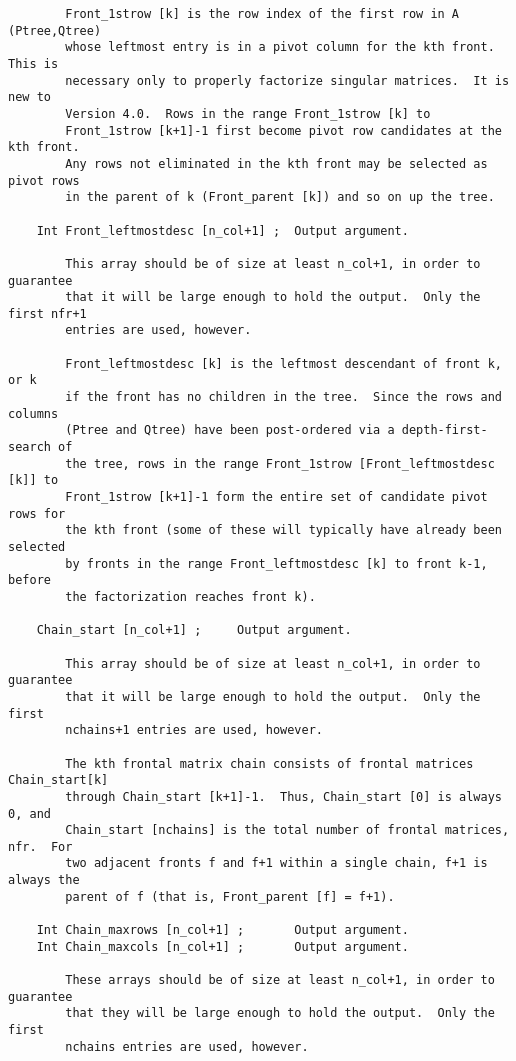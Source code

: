 {\begin{verbatim}
        Front_1strow [k] is the row index of the first row in A (Ptree,Qtree)
        whose leftmost entry is in a pivot column for the kth front.  This is
        necessary only to properly factorize singular matrices.  It is new to
        Version 4.0.  Rows in the range Front_1strow [k] to
        Front_1strow [k+1]-1 first become pivot row candidates at the kth front.
        Any rows not eliminated in the kth front may be selected as pivot rows
        in the parent of k (Front_parent [k]) and so on up the tree.

    Int Front_leftmostdesc [n_col+1] ;  Output argument.

        This array should be of size at least n_col+1, in order to guarantee
        that it will be large enough to hold the output.  Only the first nfr+1
        entries are used, however.

        Front_leftmostdesc [k] is the leftmost descendant of front k, or k
        if the front has no children in the tree.  Since the rows and columns
        (Ptree and Qtree) have been post-ordered via a depth-first-search of
        the tree, rows in the range Front_1strow [Front_leftmostdesc [k]] to
        Front_1strow [k+1]-1 form the entire set of candidate pivot rows for
        the kth front (some of these will typically have already been selected
        by fronts in the range Front_leftmostdesc [k] to front k-1, before
        the factorization reaches front k).

    Chain_start [n_col+1] ;     Output argument.

        This array should be of size at least n_col+1, in order to guarantee
        that it will be large enough to hold the output.  Only the first
        nchains+1 entries are used, however.

        The kth frontal matrix chain consists of frontal matrices Chain_start[k]
        through Chain_start [k+1]-1.  Thus, Chain_start [0] is always 0, and
        Chain_start [nchains] is the total number of frontal matrices, nfr.  For
        two adjacent fronts f and f+1 within a single chain, f+1 is always the
        parent of f (that is, Front_parent [f] = f+1).

    Int Chain_maxrows [n_col+1] ;       Output argument.
    Int Chain_maxcols [n_col+1] ;       Output argument.

        These arrays should be of size at least n_col+1, in order to guarantee
        that they will be large enough to hold the output.  Only the first
        nchains entries are used, however.


\end{verbatim}}
